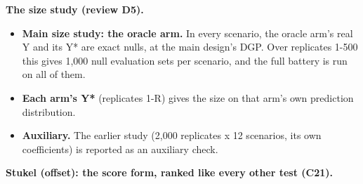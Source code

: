 \documentclass[
  10pt,
]{article}
\providecommand{\tightlist}{%
  \setlength{\itemsep}{0pt}\setlength{\parskip}{0pt}}
\begin{document}
\textbf{The size study (review D5).}

\begin{itemize}
\tightlist
\item
  \textbf{Main size study: the oracle arm.} In every
  scenario, the oracle arm's real Y and its Y* are exact
  nulls, at the main design's DGP. Over replicates 1-500
  this gives 1,000 null evaluation sets per scenario, and
  the full battery is run on all of them.
\item
  \textbf{Each arm's Y*} (replicates 1-R) gives the size on
  that arm's own prediction distribution.
\item
  \textbf{Auxiliary.} The earlier study (2,000 replicates x
  12 scenarios, its own coefficients) is reported as an
  auxiliary check.
\end{itemize}

\textbf{Stukel (offset): the score form, ranked like every
other test (C21).}
\end{document}
